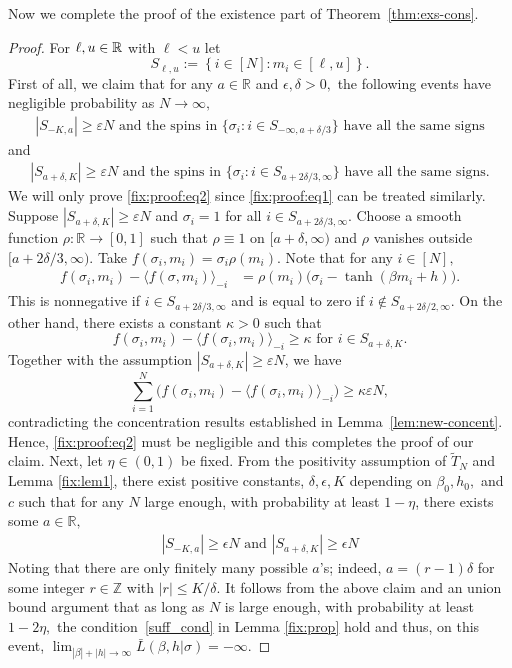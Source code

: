 \documentclass[letterpaper,11pt,reqno]{amsart}
\renewcommand{\ge}{\geqslant}
\renewcommand{\leq}{\leqslant}
\renewcommand{\geq}{\geqslant}
\newcommand{\ra}{\rangle}
\newcommand{\la}{\langle}
\newcommand{\eps}{\varepsilon}
\begin{document}
Now we complete the proof of the existence part of Theorem~\ref{thm:exs-cons}.
\begin{proof}
For $\ell, u\in \mathbb{R}$ with $\ell<u$ let
	\[ S_{\ell, u} :=  \left\{ i \in [N] : m_i \in [\ell, u] \right\}.\]
	First of all, we claim that for any $a\in \mathbb{R}$ and $\epsilon,\delta>0,$ the following events have negligible probability as $N \to \infty,$ 
\begin{align}\label{fix:proof:eq1}
|S_{-K, a}| \ge \eps N\,\,\text{and}\,\,\mbox{the spins in}\,\,\{ \sigma_i : i \in S_{-\infty, a+ \delta/3} \} \text{ have all the same signs}
\end{align}
and
\begin{align}
	\label{fix:proof:eq2}
	|S_{a+ \delta, K}| \ge \eps N\,\,\mbox{and}\,\,\mbox{the spins in}\,\,\{ \sigma_i : i \in S_{a+ 2 \delta/3, \infty} \} \text{ have all the same signs}.
\end{align}
We will only prove \eqref{fix:proof:eq2} since \eqref{fix:proof:eq1} can be treated similarly. Suppose $|S_{a +\delta, K}| \ge \eps N$ and $\sigma_i =1 $ for all $i \in S_{a + 2 \delta/3, \infty}$. Choose a smooth function $\rho : \mathbb R \to [0, 1]$ such that 
$\rho \equiv 1$ on $[a+\delta, \infty)$ and $\rho$ vanishes outside $[a+2\delta/3, \infty).$ Take $f(\sigma_i, m_i) = \sigma_i \rho(m_i).$ 
Note that  for any $i\in [N],$
\begin{align*}
f(\sigma_i,m_i)-	\la f(\sigma,m_i)\ra_{-i}&=\rho(m_i)\bigl(\sigma_i-\tanh(\beta m_i+h)\bigr).
\end{align*}
This is nonnegative if $i\in S_{a+2\delta/3,\infty}$ and is equal to zero if $i\notin S_{a+2\delta/2,\infty}.$ On the other hand, there exists a constant $\kappa>0$ such that 
\[ f(\sigma_i, m_i)  - \langle f(\sigma_i, m_i) \rangle_{-i} \ge \kappa \text{ for } i \in  S_{a +\delta, K}. \]
Together with the assumption $|S_{a +\delta, K}| \ge \eps N$, we have
\[ \sum_{i=1}^N \big( f(\sigma_i, m_i)  - \langle f(\sigma_i, m_i) \rangle_{-i} \big) \ge \kappa \eps N,\]
contradicting the concentration results established in Lemma~\ref{lem:new-concent}. Hence, \eqref{fix:proof:eq2} must be negligible and this completes the proof of our claim.
Next, let $\eta\in (0,1)$ be fixed. From the positivity assumption of $\widetilde T_N$ and Lemma \ref{fix:lem1},  there exist positive constants, $\delta,\epsilon,K$ depending on $\beta_0,h_0,$ and $c$ such that for any $N$ large enough, with probability at least $1-\eta$, there exists some $a\in \mathbb{R},$
\begin{align*}
|S_{-K,a}|\geq \epsilon N\,\,\mbox{and}\,\,|S_{a+\delta,K}|\geq \epsilon N
\end{align*}
Noting that there are only finitely many possible $a$'s; indeed, $a=(r-1)\delta$ for some integer $r\in \mathbb{Z}$ with $|r|\leq K/\delta$. It follows from the above claim and an union bound argument that as long as $N$ is large enough, with probability at least $1-2\eta,$ the condition~\eqref{suff_cond} in Lemma \ref{fix:prop} hold and thus, on this event, $\lim_{ |\beta| + |h| \to \infty} \bar L(\beta, h| \sigma)  =  - \infty.$



\end{proof}
\end{document}
